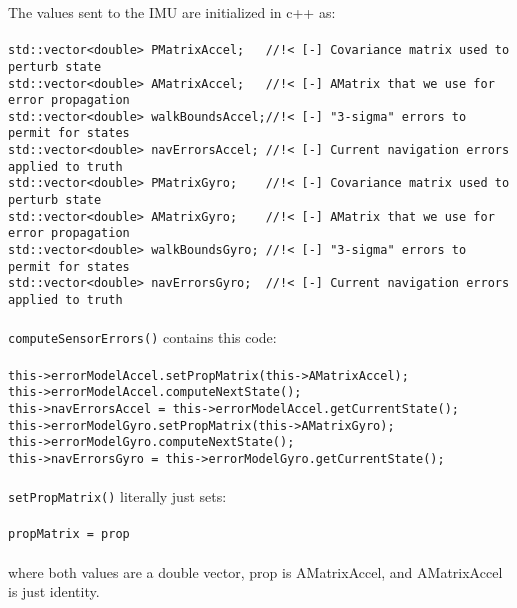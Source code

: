 \documentclass[]{BasiliskReportMemo}
\begin{document}
The values sent to the IMU are initialized in c++ as:\\\\
\verb|std::vector<double> PMatrixAccel;   //!< [-] Covariance matrix used to perturb state|\\
\verb|std::vector<double> AMatrixAccel;   //!< [-] AMatrix that we use for error propagation|\\
\verb|std::vector<double> walkBoundsAccel;//!< [-] "3-sigma" errors to permit for states|\\
\verb|std::vector<double> navErrorsAccel; //!< [-] Current navigation errors applied to truth|\\
\verb|std::vector<double> PMatrixGyro;    //!< [-] Covariance matrix used to perturb state|\\
\verb|std::vector<double> AMatrixGyro;    //!< [-] AMatrix that we use for error propagation|\\
\verb|std::vector<double> walkBoundsGyro; //!< [-] "3-sigma" errors to permit for states|\\
\verb|std::vector<double> navErrorsGyro;  //!< [-] Current navigation errors applied to truth|\\\\
\verb|computeSensorErrors()| contains this code:\\\\
\verb|this->errorModelAccel.setPropMatrix(this->AMatrixAccel);|\\
\verb|this->errorModelAccel.computeNextState();|\\
\verb|this->navErrorsAccel = this->errorModelAccel.getCurrentState();|\\
\verb|this->errorModelGyro.setPropMatrix(this->AMatrixGyro);|\\
\verb|this->errorModelGyro.computeNextState();|\\
\verb|this->navErrorsGyro = this->errorModelGyro.getCurrentState();|\\\\
\verb|setPropMatrix()| literally just sets:\\\\
\verb|propMatrix = prop|\\\\
where both values are a double vector, prop is AMatrixAccel, and AMatrixAccel is just identity.
\end{document}

